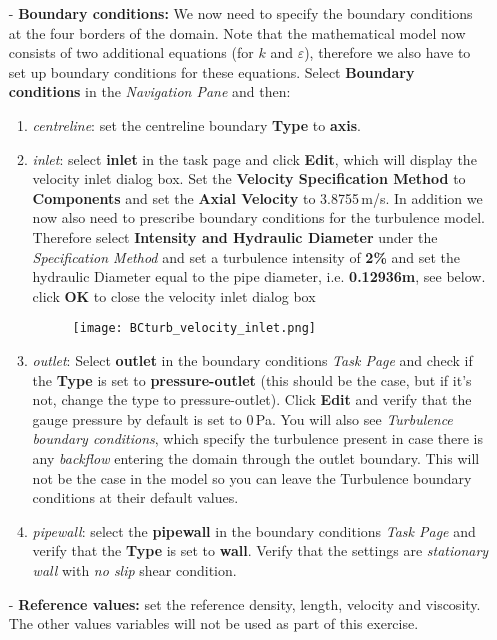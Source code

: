 \documentclass[11pt,a4paper,oneside]{scrartcl}
\newcommand\bfr[1]{\textcolor[rgb]{1,0.00,0.00}{\textbf{\textsf{#1}}}}
\begin{document}
\begin{itemize}
    \item[-] \textbf{Boundary conditions:} We now need to specify the boundary conditions at the four borders of the domain. Note that the mathematical model now consists of two additional equations (for $k$ and $\varepsilon$), therefore we also have to set up boundary conditions for these equations. Select \bfr{Boundary conditions} in the \emph{Navigation Pane} and then:
    \begin{enumerate}
        \item \emph{centreline}: set the centreline boundary \bfr{Type} to \bfr{axis}.
        \item \emph{inlet}: select \bfr{inlet} in the task page and click \bfr{Edit}, which will display the velocity inlet dialog box. Set the \bfr{Velocity Specification Method} to \bfr{Components} and set the \bfr{Axial Velocity} to 3.8755\,m/s. In addition we now also need to prescribe boundary conditions for the turbulence model. Therefore select \bfr{Intensity and Hydraulic Diameter} under the \emph{Specification Method} and set a turbulence intensity of \bfr{2\%} and set the hydraulic Diameter equal to the pipe diameter, i.e. \bfr{0.12936m}, see below. click \bfr{OK} to close the velocity inlet dialog box
            \begin{figure}[H]
            \begin{center}
            \texttt{[image: BCturb\_velocity\_inlet.png]}
            \end{center}
            \end{figure}
        \item \emph{outlet}: Select \bfr{outlet} in the boundary conditions {\it Task Page} and check if the \bfr{Type} is set to \bfr{pressure-outlet} (this should be the case, but if it's not, change the type to pressure-outlet). Click \bfr{Edit} and verify that the gauge pressure by default is set to 0\,Pa. You will also see {\it Turbulence boundary conditions}, which specify the turbulence present in case there is any  \emph{backflow} entering the domain through the outlet boundary. This will not be the case in the model so you can leave the Turbulence boundary conditions at their default values.
        \item \emph{pipewall}: select the \bfr{pipewall} in the boundary conditions {\it Task Page} and verify that the \bfr{Type} is set to \bfr{wall}. Verify that the settings are \emph{stationary wall} with \emph{no slip }shear condition.
    \end{enumerate}
    
    \item[-] \textbf{Reference values: } set the reference density, length, velocity and viscosity. The other values variables will not be used as part of this exercise.
\end{itemize}
\end{document}

